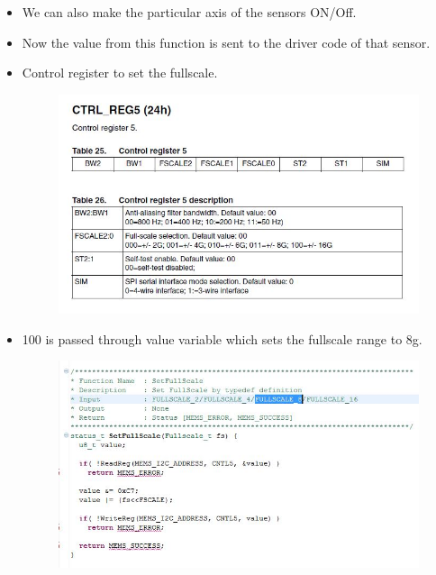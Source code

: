 \documentclass[11pt,a4paper]{article}
\begin{document}
\begin{itemize}
	\item We can also make the particular axis of the sensors ON/Off. 
	
	\item Now the value from this function is sent to the driver code of that sensor.
	
	\newpage
	
	\item Control register to set the fullscale.
	 
	\begin{figure}[h]
    \centering
	\includegraphics[scale=0.6]{setting_range1.JPG}
	\end{figure}
	
	\item 100 is passed through value variable which sets the fullscale range to 8g.
	
	 \begin{figure}[h]
    \centering
	\includegraphics[scale=0.6]{setting_range0.JPG}
	\end{figure}
	
	


\end{itemize}
\end{document}
